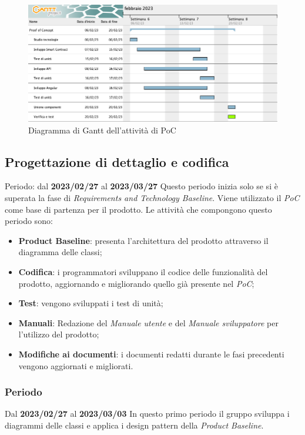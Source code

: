 \begin{figure}[H]
    \centering
    \includegraphics[scale=0.4]{src/img/Gantt PoC.png}
    \caption{Diagramma di Gantt dell'attività di PoC}
\end{figure}

\subsection{Progettazione di dettaglio e codifica}
Periodo: dal \textbf{2023/02/27} al \textbf{2023/03/27} \newline
Questo periodo inizia solo se si è superata la fase di \textit{Requirements and Technology Baseline}. Viene utilizzato il \textit{PoC}
come base di partenza per il prodotto. Le attività che compongono questo periodo sono:
\begin{itemize}
        \item \textbf{Product Baseline\glo }: presenta l'architettura del prodotto attraverso il diagramma delle classi;
        \item \textbf{Codifica}: i programmatori sviluppano il codice delle funzionalità del prodotto, aggiornando e migliorando quello già presente nel \textit{PoC};
        \item \textbf{Test}: vengono sviluppati i test di unità;
        \item \textbf{Manuali}: Redazione del \textit{Manuale utente} e del \textit{Manuale sviluppatore} per l'utilizzo del prodotto;
        \item \textbf{Modifiche ai documenti}: i documenti redatti durante le fasi precedenti vengono aggiornati e migliorati.
\end{itemize}

\subsubsection{ Periodo}
Dal \textbf{2023/02/27} al \textbf{2023/03/03}
\newline
In questo primo periodo il gruppo sviluppa i diagrammi delle classi e applica i design pattern della \textit{Product Baseline}.
